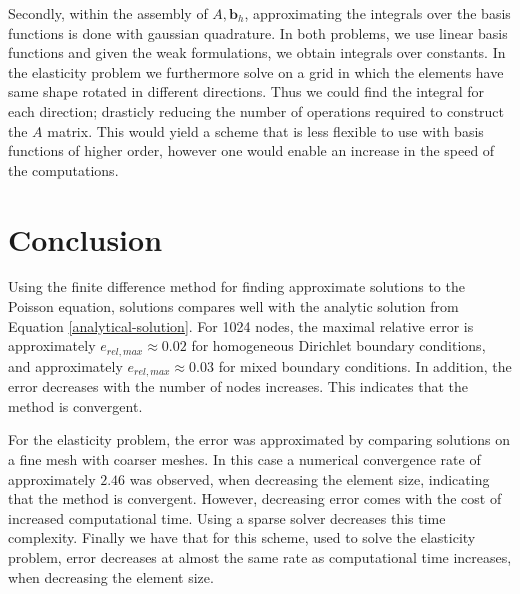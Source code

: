 \documentclass[a4paper,english]{elsarticle}%
\begin{document}
Secondly, within the assembly of $A,\bm b_h$, approximating the integrals over the basis functions is done with gaussian quadrature. In both problems, we use linear basis functions and given the weak formulations, we obtain integrals over constants. In the elasticity problem we furthermore solve on a grid in which the elements have same shape rotated in different directions. Thus we could find the integral for each direction; drasticly reducing the number of operations required to construct the $A$ matrix. This would yield a scheme that is less flexible to use with basis functions of higher order, however one would enable an increase in the speed of the computations. 
   
\section{Conclusion}
Using the finite difference method for finding approximate solutions to the Poisson equation, solutions compares well with the analytic solution from Equation \eqref{analytical-solution}. For 1024 nodes, the maximal relative error is approximately $e_{rel,max} \approx 0.02$ for homogeneous Dirichlet boundary conditions, and approximately $e_{rel,max} \approx 0.03$ for mixed boundary conditions. In addition, the error decreases with the number of nodes increases. This indicates that the method is convergent.

For the elasticity problem, the error was approximated by comparing solutions on a fine mesh with coarser meshes. In this case a numerical convergence rate of approximately $2.46$ was observed, when decreasing the element size, indicating that the method is convergent. However, decreasing error comes with the cost of increased computational time. Using a sparse solver decreases this time complexity. Finally we have that for this scheme, used to solve the elasticity problem, error decreases at almost the same rate as computational time increases, when decreasing the element size.

\end{document}
